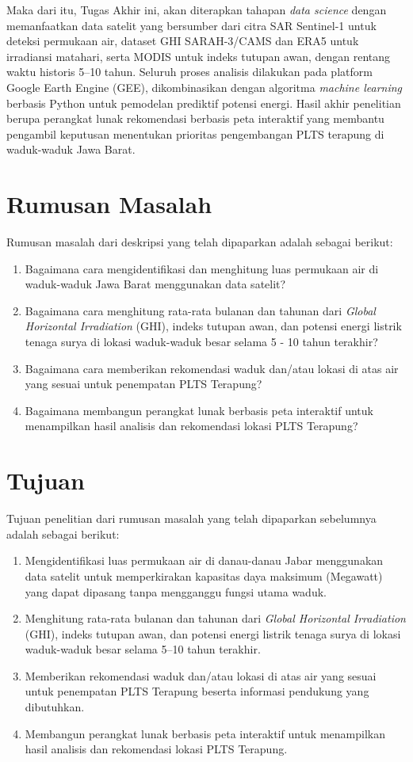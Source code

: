 \documentclass[a4paper,twoside]{article}
\begin{document}
Maka dari itu, Tugas Akhir ini, akan diterapkan tahapan \textit{data science}
dengan memanfaatkan data satelit yang bersumber dari citra SAR Sentinel-1
untuk deteksi permukaan air, dataset GHI SARAH-3/CAMS dan ERA5 untuk
irradiansi matahari, serta MODIS untuk indeks tutupan awan, dengan
rentang waktu historis 5--10 tahun. Seluruh proses analisis dilakukan
pada platform Google Earth Engine (GEE), dikombinasikan dengan algoritma
\textit{machine learning} berbasis Python untuk pemodelan prediktif
potensi energi. Hasil akhir penelitian berupa perangkat lunak rekomendasi
berbasis peta interaktif yang membantu pengambil keputusan menentukan
prioritas pengembangan PLTS terapung di waduk-waduk Jawa Barat.

\section{Rumusan Masalah}
Rumusan masalah dari deskripsi yang telah dipaparkan adalah sebagai berikut:
\begin{enumerate}
	\item Bagaimana cara mengidentifikasi dan menghitung luas permukaan air di waduk-waduk Jawa Barat
	      menggunakan data satelit?
	\item Bagaimana cara menghitung rata-rata bulanan dan tahunan dari \textit{Global Horizontal Irradiation}
	      (GHI), indeks tutupan awan, dan potensi energi listrik tenaga surya di lokasi waduk-waduk besar
	      selama 5 - 10 tahun terakhir?
	\item Bagaimana cara memberikan rekomendasi waduk dan/atau lokasi di atas air yang sesuai untuk
	      penempatan PLTS Terapung?
	\item Bagaimana membangun perangkat lunak berbasis peta interaktif untuk menampilkan hasil analisis dan
	      rekomendasi lokasi PLTS Terapung?
\end{enumerate}


\section{Tujuan}
Tujuan penelitian dari rumusan masalah yang telah dipaparkan sebelumnya adalah sebagai berikut:
\begin{enumerate}
	\item Mengidentifikasi luas permukaan air di danau-danau Jabar menggunakan data satelit
	      untuk memperkirakan kapasitas daya maksimum (Megawatt) yang dapat dipasang tanpa mengganggu
	      fungsi utama waduk.
	\item Menghitung rata-rata bulanan dan tahunan dari \textit{Global Horizontal Irradiation} (GHI),
	      indeks tutupan awan, dan potensi energi listrik tenaga surya di lokasi waduk-waduk besar selama 5--10
	      tahun terakhir.
	\item Memberikan rekomendasi waduk dan/atau lokasi di atas air yang sesuai untuk penempatan PLTS
	      Terapung beserta informasi pendukung yang dibutuhkan.
	\item Membangun perangkat lunak berbasis peta interaktif untuk menampilkan hasil analisis dan
	      rekomendasi lokasi PLTS Terapung.
\end{enumerate}
\end{document}
